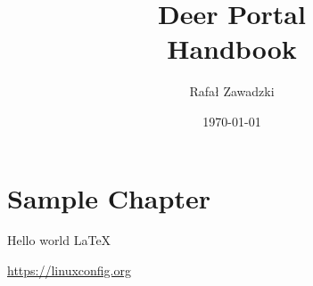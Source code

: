 \documentclass[12pt]{article}
\title{Deer Portal \\ \large Handbook}
\date{\today}
\author{Rafał Zawadzki}
\begin{document}
\maketitle
\newpage
\tableofcontents
\newpage
\section*{Sample Chapter}
Hello world \LaTeX

\url{https://linuxconfig.org}
\end{document}
